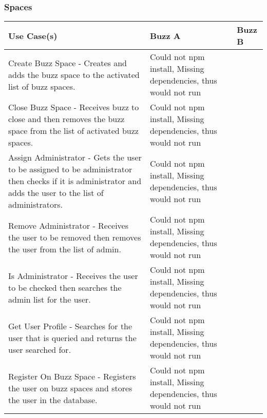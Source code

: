 \documentclass[12pt]{article}
\begin{document}
\subsubsection{Spaces}%
\begin{tabular}{|p{4.5cm}|p{4.5cm}|p{4.5cm}|}

\hline
Use Case(s) & Buzz A & Buzz B \\ 
\hline
Create Buzz Space - Creates and adds the buzz space to the activated list of buzz spaces. & Could not npm install, Missing dependencies, thus would not run &  \\ %
\hline
Close Buzz Space - Receives buzz to close and then removes the buzz space from the list of activated buzz spaces. & Could not npm install, Missing dependencies, thus would not run & \\ %
\hline
Assign Administrator - Gets the user to be assigned to be administrator then checks if it is administrator and adds the user to the list of administrators.  & Could not npm install, Missing dependencies, thus would not run & \\ %
\hline
Remove Administrator - Receives the user to be removed then removes the user from the list of admin. & Could not npm install, Missing dependencies, thus would not run &  \\ %
\hline
Is Administrator - Receives the user to be checked then searches the admin list for the user.  & Could not npm install, Missing dependencies, thus would not run &  \\ %
\hline
Get User Profile - Searches for the user that is queried and returns the user searched for. & Could not npm install, Missing dependencies, thus would not run &  \\ %
\hline
Register On Buzz Space - Registers the user on buzz spaces and stores the user in the database. & Could not npm install, Missing dependencies, thus would not run &  \\ %
\hline


\end{tabular}
\end{document}
